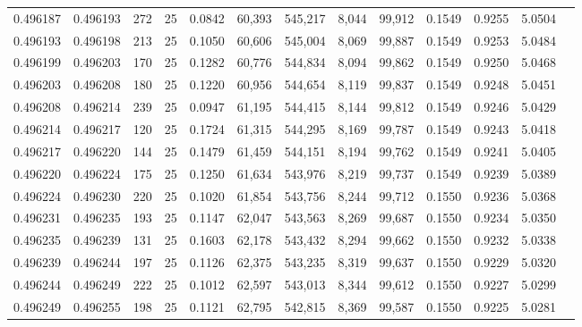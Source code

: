 \begin{tabular}{rrrrrrrrrrrrr}
0.496187 & 0.496193 & 272 &  25 &                                     0.0842 &  60,393 & 545,217 &   8,044 &  99,912 & 0.1549 & 0.9255 & 5.0504 \\
0.496193 & 0.496198 & 213 &  25 &                                     0.1050 &  60,606 & 545,004 &   8,069 &  99,887 & 0.1549 & 0.9253 & 5.0484 \\
0.496199 & 0.496203 & 170 &  25 &                                     0.1282 &  60,776 & 544,834 &   8,094 &  99,862 & 0.1549 & 0.9250 & 5.0468 \\
0.496203 & 0.496208 & 180 &  25 &                                     0.1220 &  60,956 & 544,654 &   8,119 &  99,837 & 0.1549 & 0.9248 & 5.0451 \\
0.496208 & 0.496214 & 239 &  25 &                                     0.0947 &  61,195 & 544,415 &   8,144 &  99,812 & 0.1549 & 0.9246 & 5.0429 \\
0.496214 & 0.496217 & 120 &  25 &                                     0.1724 &  61,315 & 544,295 &   8,169 &  99,787 & 0.1549 & 0.9243 & 5.0418 \\
0.496217 & 0.496220 & 144 &  25 &                                     0.1479 &  61,459 & 544,151 &   8,194 &  99,762 & 0.1549 & 0.9241 & 5.0405 \\
0.496220 & 0.496224 & 175 &  25 &                                     0.1250 &  61,634 & 543,976 &   8,219 &  99,737 & 0.1549 & 0.9239 & 5.0389 \\
0.496224 & 0.496230 & 220 &  25 &                                     0.1020 &  61,854 & 543,756 &   8,244 &  99,712 & 0.1550 & 0.9236 & 5.0368 \\
0.496231 & 0.496235 & 193 &  25 &                                     0.1147 &  62,047 & 543,563 &   8,269 &  99,687 & 0.1550 & 0.9234 & 5.0350 \\
0.496235 & 0.496239 & 131 &  25 &                                     0.1603 &  62,178 & 543,432 &   8,294 &  99,662 & 0.1550 & 0.9232 & 5.0338 \\
0.496239 & 0.496244 & 197 &  25 &                                     0.1126 &  62,375 & 543,235 &   8,319 &  99,637 & 0.1550 & 0.9229 & 5.0320 \\
0.496244 & 0.496249 & 222 &  25 &                                     0.1012 &  62,597 & 543,013 &   8,344 &  99,612 & 0.1550 & 0.9227 & 5.0299 \\
0.496249 & 0.496255 & 198 &  25 &                                     0.1121 &  62,795 & 542,815 &   8,369 &  99,587 & 0.1550 & 0.9225 & 5.0281 \\

\end{tabular}
